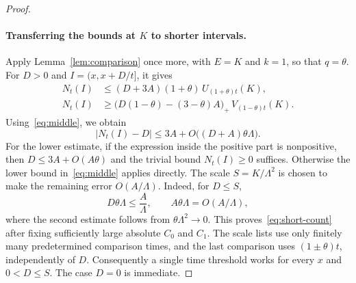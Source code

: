 \documentclass[11pt]{article}
\theoremstyle{remark}
\numberwithin{equation}{section}
\begin{document}
\begin{proof}
\paragraph{Transferring the bounds at $K$ to shorter intervals.}
Apply Lemma~\ref{lem:comparison} once more, with $E=K$ and $k=1$, so that
$q=\theta$. For $D>0$ and $I=(x,x+D/t]$, it gives
\begin{align*}
  N_t(I)&\leq
    (D+3A)(1+\theta)\,U_{(1+\theta)t}(K),\\
  N_t(I)&\geq
    \bigl(D(1-\theta)-(3-\theta)A\bigr)_+\,
    V_{(1-\theta)t}(K).
\end{align*}
Using~\eqref{eq:middle}, we obtain
\begin{equation}\label{eq:additive-error}
  |N_t(I)-D|
  \leq3A+O\bigl((D+A)\theta\Lambda\bigr).
\end{equation}
For the lower estimate, if the expression inside the positive part is
nonpositive, then $D\leq3A+O(A\theta)$ and the trivial bound $N_t(I)\geq0$
suffices. Otherwise the lower bound in~\eqref{eq:middle} applies directly.
The scale $S=K/\Lambda^2$ is chosen to make the remaining error
$O(A/\Lambda)$. Indeed, for $D\leq S$,
\[
  D\theta\Lambda\leq\frac A\Lambda,
  \qquad
  A\theta\Lambda=O(A/\Lambda),
\]
where the second estimate follows from $\theta\Lambda^2\to0$.
This proves~\eqref{eq:short-count} after fixing sufficiently large absolute
$C_0$ and $C_1$.
The scale lists use only finitely many predetermined comparison times,
and the last comparison uses $(1\pm\theta)t$, independently of $D$.
Consequently a single time threshold works for every $x$ and
$0<D\leq S$. The case $D=0$ is immediate.
\end{proof}
\end{document}
